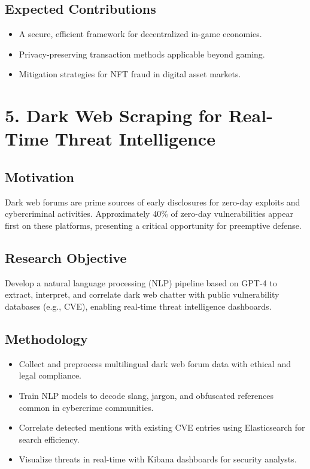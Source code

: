 \documentclass[11pt]{article}
\begin{document}
\subsection{Expected Contributions}
\label{sec:org1f75128}
\begin{itemize}
\item A secure, efficient framework for decentralized in-game economies.
\item Privacy-preserving transaction methods applicable beyond gaming.
\item Mitigation strategies for NFT fraud in digital asset markets.
\end{itemize}
\section{5. Dark Web Scraping for Real-Time Threat Intelligence}
\label{sec:org6cdf62d}
\subsection{Motivation}
\label{sec:orgff81578}
Dark web forums are prime sources of early disclosures for zero-day exploits and cybercriminal activities. Approximately 40\% of zero-day vulnerabilities appear first on these platforms, presenting a critical opportunity for preemptive defense.
\subsection{Research Objective}
\label{sec:org62c5e2e}
Develop a natural language processing (NLP) pipeline based on GPT-4 to extract, interpret, and correlate dark web chatter with public vulnerability databases (e.g., CVE), enabling real-time threat intelligence dashboards.
\subsection{Methodology}
\label{sec:org00d2925}
\begin{itemize}
\item Collect and preprocess multilingual dark web forum data with ethical and legal compliance.
\item Train NLP models to decode slang, jargon, and obfuscated references common in cybercrime communities.
\item Correlate detected mentions with existing CVE entries using Elasticsearch for search efficiency.
\item Visualize threats in real-time with Kibana dashboards for security analysts.
\end{itemize}
\end{document}
